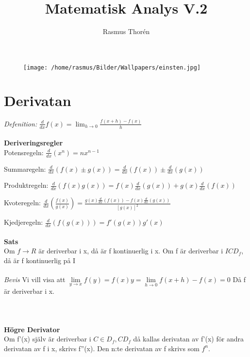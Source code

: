 \documentclass{article}
\title{Matematisk Analys  V.2}
\author{Rasmus Thorén}
\begin{document}
	\maketitle
	\begin{figure}[h]
		\centering
		\texttt{[image: /home/rasmus/Bilder/Wallpapers/einsten.jpg]}
		\label{fig:image}
	\end{figure}
	
	\section{Derivatan}
	\textit{Defenition:}
	$\frac{d}{dx}f(x)=\lim_{h\to 0}\frac{f(x+h)-f(x)}{h}$
	\\\\
	\textbf{Deriveringsregler} \\
	
	Potensregeln: $\frac{d}{dx}(x^n)=nx^{n-1}$
	
	Summaregeln: $\frac{d}{dx}(f(x)\pm g(x))=\frac{d}{dx}(f(x))\pm \frac{d}{dx}(g(x))$
	
	Produktregeln: $\frac{d}{dx}(f(x)g(x))=f(x)\frac{d}{dx}(g(x))+g(x)\frac{d}{dx}(f(x))$
	
	Kvoteregeln: $\frac{d}{dx}\left(\frac{f(x)}{g(x)}\right)=\frac{g(x)\frac{d}{dx}(f(x))-f(x)\frac{d}{dx}(g(x))}{[g(x)]^2}$
	
	Kjedjeregeln: $\frac{d}{dx}(f(g(x)))=f'(g(x))g'(x)$
	\\\\
	\textbf{Sats}\\
	Om $f\to R$ är deriverbar i x, då är f kontinuerlig i x. Om f är deriverbar i $I CD_f$, då är f kontinuerlig på I
	\\\\
	\textit{Bevis} 
	Vi vill visa att
	 $\lim\limits_{y\to x} f(y)=f(x)y=\lim\limits_{h\to 0}f(x+h)-f(x)=0$ Då f är deriverbar
	 i x. 
	\\\\\\\\
	\textbf{Högre Derivator}\\
	Om f'(x) själv är deriverbar i $C\in D_f,CD_f$ då kallas derivatan av f'(x) för andra derivatan av f i x, skrivs f''(x). Den n:te derivatan av f skrivs som $f^n$.
	\\\\
\end{document}
